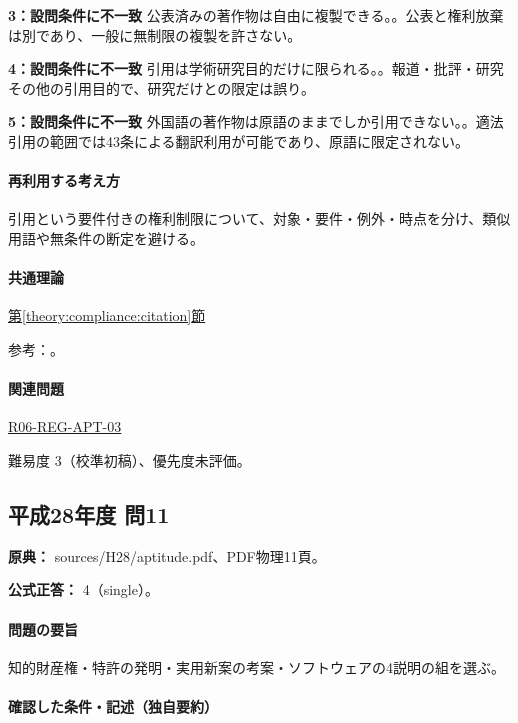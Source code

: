 \noindent\textbf{3：設問条件に不一致} 公表済みの著作物は自由に複製できる。。公表と権利放棄は別であり、一般に無制限の複製を許さない。\par

\noindent\textbf{4：設問条件に不一致} 引用は学術研究目的だけに限られる。。報道・批評・研究その他の引用目的で、研究だけとの限定は誤り。\par

\noindent\textbf{5：設問条件に不一致} 外国語の著作物は原語のままでしか引用できない。。適法引用の範囲では43条による翻訳利用が可能であり、原語に限定されない。\par

\paragraph{再利用する考え方} 引用という要件付きの権利制限について、対象・要件・例外・時点を分け、類似用語や無条件の断定を避ける。

\paragraph{共通理論} \hyperref[theory:compliance:citation]{第\ref*{theory:compliance:citation}節}

\par 参考：\cite{bunka_citation_faq,kyushu_copyright2015}。

\paragraph{関連問題} \hyperref[q:r06-reg-apt-03]{R06-REG-APT-03}

\par 難易度 3（校準初稿）、優先度未評価。

\subsection{平成28年度 問11}
\label{q:h28-reg-apt-11}

\noindent\textbf{原典：} sources/H28/aptitude.pdf、PDF物理11頁。

\textbf{公式正答：} 4（single）。

\paragraph{問題の要旨} 知的財産権・特許の発明・実用新案の考案・ソフトウェアの4説明の組を選ぶ。

\paragraph{確認した条件・記述（独自要約）}\mbox{}\par

